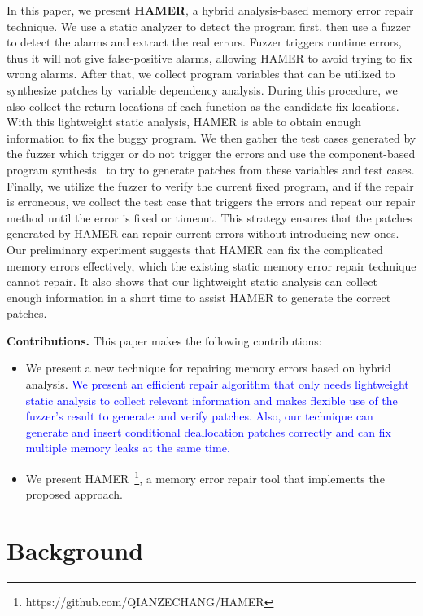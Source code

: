 \documentclass[a4paper,11pt,oneside,openany]{book}
\begin{document}
In this paper, we present \textbf{HAMER}, a hybrid analysis-based memory error repair \mbox{technique}. We use a static analyzer to detect the program first, then use a fuzzer to detect the alarms and extract the real errors. Fuzzer triggers runtime errors, thus it will not give false-positive alarms, allowing HAMER to avoid trying to fix wrong alarms. After that, we collect program variables that can be utilized to synthesize patches by variable dependency analysis. During this procedure, we also collect the return locations of each function as the candidate fix locations. With this lightweight static analysis, HAMER is able to obtain enough information to fix the buggy program. We then gather the test cases generated by the fuzzer which trigger or do not trigger the errors and use the component-based program synthesis~\cite{oracle} to try to generate patches from these variables and test cases. Finally, we utilize the fuzzer to verify the current fixed program, and if the repair is erroneous, we collect the test case that triggers the errors and repeat our repair method until the error is fixed or timeout. This strategy ensures that the patches generated by HAMER can repair current errors without introducing new ones. Our preliminary experiment suggests that HAMER can fix the complicated memory errors effectively, which the existing static memory error repair technique cannot repair. It also shows that our lightweight static analysis can collect enough information in a short time to assist HAMER to generate the correct patches.

\textbf{Contributions.} This paper makes the following contributions:
\begin{itemize}
  \item We present a new technique for repairing memory errors based on hybrid analysis. \textcolor{blue}{We present an efficient repair algorithm that only needs lightweight static analysis to collect relevant information and makes flexible use of the fuzzer's result to generate and verify patches. Also, our technique can generate and insert conditional deallocation patches correctly and can fix multiple memory leaks at the same time.}
  \item We present HAMER~\footnote{https://github.com/QIANZECHANG/HAMER}, a memory error repair tool that implements the proposed approach.
\end{itemize}


\chapter{Background}
\end{document}
